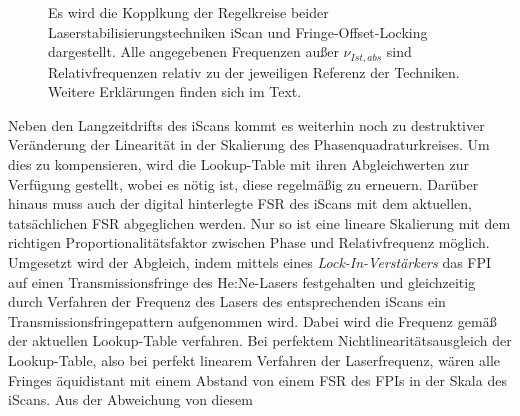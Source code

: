 \begin{figure}[h]
 	\centering
	\caption[Regelkreis - Kopplung]{Es wird die
	Kopplkung der Regelkreise beider
	Laserstabilisierungstechniken iScan und
	Fringe-Offset-Locking dargestellt. Alle
	angegebenen Frequenzen außer $\nu_{Ist,abs}$ sind
	Relativfrequenzen relativ zu der jeweiligen
	Referenz der Techniken. Weitere Erklärungen
	finden sich im Text.}\label{fig:regelkreis_kopplung}
\end{figure}
Neben den Langzeitdrifts des iScans kommt es weiterhin noch zu destruktiver
Veränderung der Linearität in der Skalierung des Phasenquadraturkreises. Um
dies zu kompensieren, wird die Lookup-Table mit ihren Abgleichwerten zur
Verfügung gestellt, wobei es nötig ist, diese regelmäßig zu erneuern.
Darüber hinaus muss auch der digital hinterlegte FSR des iScans mit dem
aktuellen, tatsächlichen FSR abgeglichen werden. Nur so ist eine lineare
Skalierung mit dem richtigen Proportionalitätsfaktor zwischen Phase und
Relativfrequenz möglich. Umgesetzt wird der Abgleich, indem mittels eines
\textit{Lock-In-Verstärkers} das FPI auf einen Transmissionsfringe des
He:Ne-Lasers festgehalten und gleichzeitig durch Verfahren der Frequenz des
Lasers des entsprechenden iScans ein Transmissionsfringepattern aufgenommen
wird. Dabei wird die Frequenz gemäß der aktuellen Lookup-Table verfahren. Bei
perfektem Nichtlinearitätsausgleich der Lookup-Table, also bei perfekt linearem
Verfahren der Laserfrequenz, wären alle Fringes äquidistant mit einem Abstand
von einem FSR des FPIs in der Skala des iScans. Aus der Abweichung von diesem
